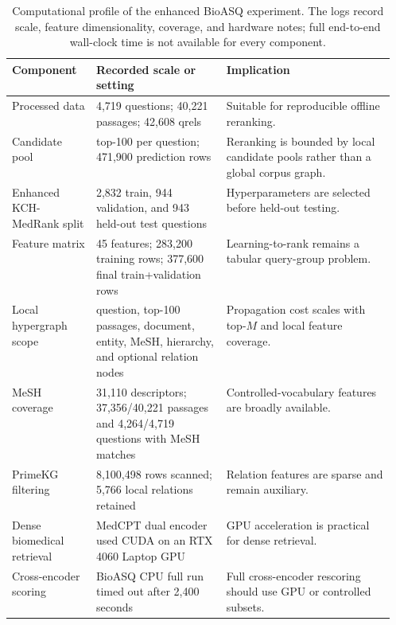 \begin{table}[t]
\centering
\small
\caption{Computational profile of the enhanced BioASQ experiment. The logs record scale, feature dimensionality, coverage, and hardware notes; full end-to-end wall-clock time is not available for every component.}
\label{tab:efficiency-analysis}
\begin{tabularx}{\linewidth}{p{0.22\linewidth}p{0.34\linewidth}X}
\toprule
Component & Recorded scale or setting & Implication \\
\midrule
Processed data & 4,719 questions; 40,221 passages; 42,608 qrels & Suitable for reproducible offline reranking. \\
Candidate pool & top-100 per question; 471,900 prediction rows & Reranking is bounded by local candidate pools rather than a global corpus graph. \\
Enhanced KCH-MedRank split & 2,832 train, 944 validation, and 943 held-out test questions & Hyperparameters are selected before held-out testing. \\
Feature matrix & 45 features; 283,200 training rows; 377,600 final train+validation rows & Learning-to-rank remains a tabular query-group problem. \\
Local hypergraph scope & question, top-100 passages, document, entity, MeSH, hierarchy, and optional relation nodes & Propagation cost scales with top-$M$ and local feature coverage. \\
MeSH coverage & 31,110 descriptors; 37,356/40,221 passages and 4,264/4,719 questions with MeSH matches & Controlled-vocabulary features are broadly available. \\
PrimeKG filtering & 8,100,498 rows scanned; 5,766 local relations retained & Relation features are sparse and remain auxiliary. \\
Dense biomedical retrieval & MedCPT dual encoder used CUDA on an RTX 4060 Laptop GPU & GPU acceleration is practical for dense retrieval. \\
Cross-encoder scoring & BioASQ CPU full run timed out after 2,400 seconds & Full cross-encoder rescoring should use GPU or controlled subsets. \\
\bottomrule
\end{tabularx}
\end{table}
